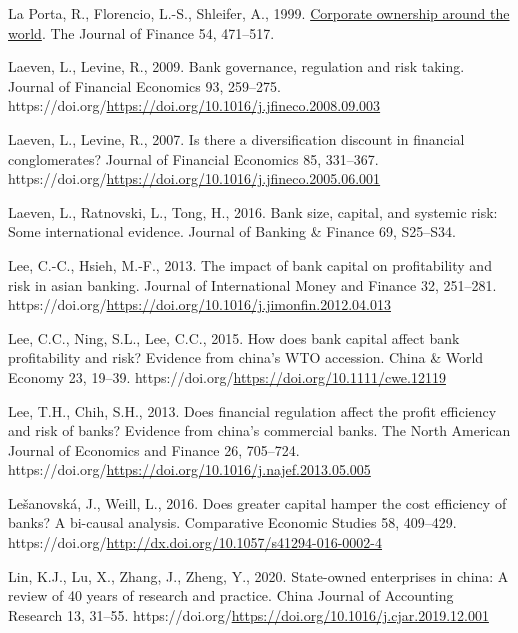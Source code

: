 \documentclass[
  letterpaper,
  DIV=11,
  numbers=noendperiod]{scrreprt}
\newlength{\cslhangindent}
\newenvironment{CSLReferences}[2] %
 {\begin{list}{}{%
  \setlength{\itemindent}{0pt}
  \setlength{\leftmargin}{0pt}
  \setlength{\parsep}{0pt}
  \ifodd #1
   \setlength{\leftmargin}{\cslhangindent}
   \setlength{\itemindent}{-1\cslhangindent}
  \fi
  \setlength{\itemsep}{#2\baselineskip}}}
 {\end{list}}
\begin{document}
\begin{CSLReferences}{1}{0}
La Porta, R., Florencio, L.-S., Shleifer, A., 1999.
\href{http://www.jstor.org.queens.ezp1.qub.ac.uk/stable/2697717}{Corporate
ownership around the world}. The Journal of Finance 54, 471--517.

Laeven, L., Levine, R., 2009. Bank governance, regulation and risk
taking. Journal of Financial Economics 93, 259--275.
https://doi.org/\url{https://doi.org/10.1016/j.jfineco.2008.09.003}

Laeven, L., Levine, R., 2007. Is there a diversification discount in
financial conglomerates? Journal of Financial Economics 85, 331--367.
https://doi.org/\url{https://doi.org/10.1016/j.jfineco.2005.06.001}

Laeven, L., Ratnovski, L., Tong, H., 2016. Bank size, capital, and
systemic risk: Some international evidence. Journal of Banking \&
Finance 69, S25--S34.

Lee, C.-C., Hsieh, M.-F., 2013. The impact of bank capital on
profitability and risk in asian banking. Journal of International Money
and Finance 32, 251--281.
https://doi.org/\url{https://doi.org/10.1016/j.jimonfin.2012.04.013}

Lee, C.C., Ning, S.L., Lee, C.C., 2015. How does bank capital affect
bank profitability and risk? Evidence from china's WTO accession. China
\& World Economy 23, 19--39.
https://doi.org/\url{https://doi.org/10.1111/cwe.12119}

Lee, T.H., Chih, S.H., 2013. Does financial regulation affect the profit
efficiency and risk of banks? Evidence from china's commercial banks.
The North American Journal of Economics and Finance 26, 705--724.
https://doi.org/\url{https://doi.org/10.1016/j.najef.2013.05.005}

Lešanovská, J., Weill, L., 2016. Does greater capital hamper the cost
efficiency of banks? A bi-causal analysis. Comparative Economic Studies
58, 409--429.
https://doi.org/\url{http://dx.doi.org/10.1057/s41294-016-0002-4}

Lin, K.J., Lu, X., Zhang, J., Zheng, Y., 2020. State-owned enterprises
in china: A review of 40 years of research and practice. China Journal
of Accounting Research 13, 31--55.
https://doi.org/\url{https://doi.org/10.1016/j.cjar.2019.12.001}


\end{CSLReferences}
\end{document}
